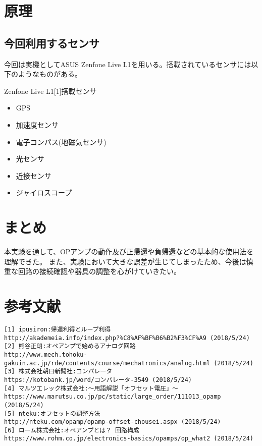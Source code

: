 \documentclass[a4j]{jarticle}
\begin{document}
\section{原理}
\subsection{今回利用するセンサ}

今回は実機としてASUS Zenfone Live L1を用いる。搭載されているセンサには以下のようなものがある。\par
Zenfone Live L1[1]搭載センサ
\begin{itemize}
\item GPS
\item 加速度センサ
\item 電子コンパス(地磁気センサ)
\item 光センサ
\item 近接センサ
\item ジャイロスコープ
\end{itemize}




\section{まとめ}
本実験を通して、OPアンプの動作及び正帰還や負帰還などの基本的な使用法を理解できた。
また、実験において大きな誤差が生じてしまったため、今後は慎重な回路の接続確認や器具の調整を心がけていきたい。


\section{参考文献}
\begin{verbatim}
[1] ipusiron:帰還利得とループ利得
http://akademeia.info/index.php?%C8%AF%BF%B6%B2%F3%CF%A9 (2018/5/24)
[2] 熊谷正朗:オペアンプで始めるアナログ回路
http://www.mech.tohoku-gakuin.ac.jp/rde/contents/course/mechatronics/analog.html (2018/5/24)
[3] 株式会社朝日新聞社:コンパレータ
https://kotobank.jp/word/コンパレータ-3549 (2018/5/24)
[4] マルツエレック株式会社:～用語解説「オフセット電圧」～
https://www.marutsu.co.jp/pc/static/large_order/111013_opamp (2018/5/24)
[5] nteku:オフセットの調整方法
http://nteku.com/opamp/opamp-offset-chousei.aspx (2018/5/24)
[6] ローム株式会社:オペアンプとは？ 回路構成
https://www.rohm.co.jp/electronics-basics/opamps/op_what2 (2018/5/24)
\end{verbatim}
\end{document}
